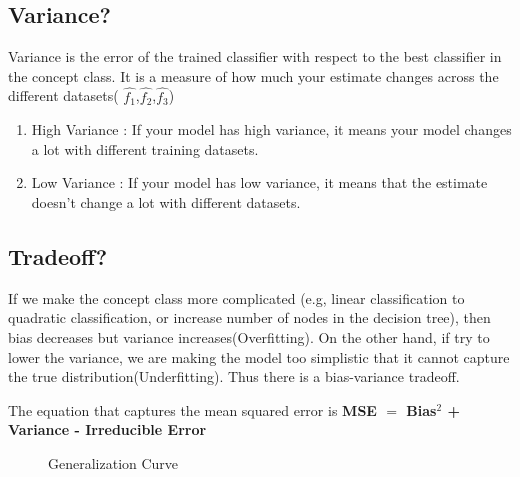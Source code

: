 \documentclass{article}
\begin{document}
\subsection {Variance?}
Variance is the error of the trained classifier with respect to the best classifier in the concept class. It is a measure of how much your estimate changes across the different datasets( $\hat{f_1}$,$\hat{f_2}$,$\hat{f_3}$)
\begin{enumerate}
\item High Variance : If your model has high variance, it means your model changes a lot with different training datasets. 
\item Low Variance : If your model has low variance, it means that the estimate doesn't change a lot with different datasets.
\end{enumerate}
\subsection {Tradeoff?}
If we make the concept class more complicated (e.g, linear classification to quadratic classification, or increase number of nodes in the decision tree), then bias decreases but variance increases(Overfitting). On the other hand, if try to lower the variance, we are making the model too simplistic that it cannot capture the true distribution(Underfitting). 
Thus there is a bias-variance tradeoff.

The equation that captures the mean squared error is 
\textbf{MSE $=$ Bias$^2$ + Variance  - Irreducible Error}
 \begin{figure}[h]
\centering
\caption{Generalization Curve}
{\setlength{\fboxsep}{20pt}
\setlength{\fboxrule}{1pt}
\textcolor{cyan}{}
}
\end{figure} 
 
\end{document}
